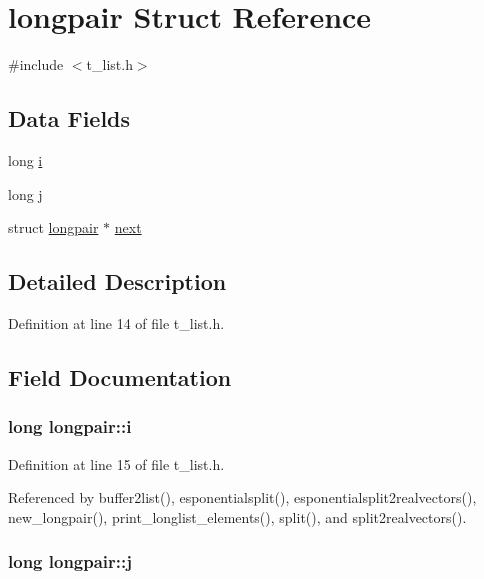 \hypertarget{structlongpair}{\section{longpair Struct Reference}
\label{structlongpair}
}


{\ttfamily \#include $<$t\-\_\-list.\-h$>$}

\subsection*{Data Fields}
\begin{DoxyCompactItemize}
\item 
long \hyperlink{structlongpair_a0c2697f0bb09a80c7d140e60ce79df24}{i}
\item 
long \hyperlink{structlongpair_ab2dfd851d39ae8e9c985525c01786012}{j}
\item 
struct \hyperlink{structlongpair}{longpair} $\ast$ \hyperlink{structlongpair_a022c0552d55e1807ca6d7f187fdf9f38}{next}
\end{DoxyCompactItemize}


\subsection{Detailed Description}


Definition at line 14 of file t\-\_\-list.\-h.



\subsection{Field Documentation}
\hypertarget{structlongpair_a0c2697f0bb09a80c7d140e60ce79df24}{
\subsubsection[{i}]{\setlength{\rightskip}{0pt plus 5cm}long longpair\-::i}}\label{structlongpair_a0c2697f0bb09a80c7d140e60ce79df24}


Definition at line 15 of file t\-\_\-list.\-h.



Referenced by buffer2list(), esponentialsplit(), esponentialsplit2realvectors(), new\-\_\-longpair(), print\-\_\-longlist\-\_\-elements(), split(), and split2realvectors().

\hypertarget{structlongpair_ab2dfd851d39ae8e9c985525c01786012}{
\subsubsection[{j}]{\setlength{\rightskip}{0pt plus 5cm}long longpair\-::j}}\label{structlongpair_ab2dfd851d39ae8e9c985525c01786012}


